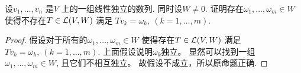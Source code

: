\begin{problem}{13}
  设$v_1,\dots, v_n$ 是$V$ 上的一组线性独立的数列.
  同时设$W\neq{0}$. 证明存在$\omega_1,\dots,\omega_m \in W $
  使得不存在$T\in\mathcal{L}(V,W)$ 满足 $Tv_k=\omega_k,\ (k=1,\dots,m)$. 
\end{problem}

\begin{proof}
  假设对于所有的$\omega_1,\dots,\omega_m \in W $
  使得存在$T\in\mathcal{L}(V,W)$ 满足 
  $Tv_k=\omega_k,\ (k=1,\dots,m)$.
  上面假设说明$\omega_k$独立。
  显然可以找到一组
  $\omega_1,\dots,\omega_m \in W $,
  且它们不相互独立。
  故假设不成立，所以原命题正确.
\end{proof}
